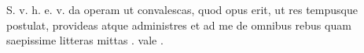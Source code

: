 


S. v. h. e. v. da operam ut convalescas, quod opus erit, ut res tempusque postulat, provideas atque administres et ad me de omnibus rebus quam saepissime litteras mittas . vale .
